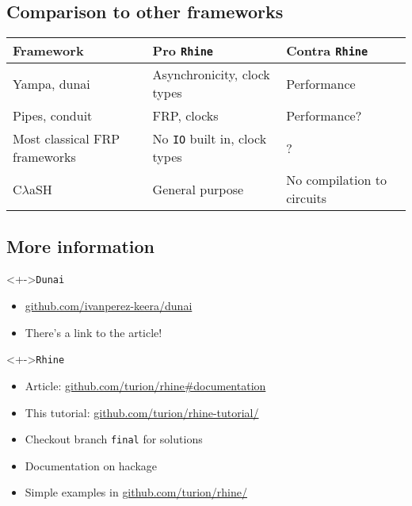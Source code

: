 \documentclass{enigtex-beamer-base}
\begin{document}
\subsection{Comparison to other frameworks}

\begin{frame}[fragile]
	\begin{tabular}{p{2.5cm}p{3.5cm}p{3.5cm}}
		\toprule
		\textbf{Framework}
			& \textbf{Pro \texttt{Rhine}}
				& \textbf{Contra \texttt{Rhine}}
		\\\midrule
		Yampa, dunai
			& Asynchronicity, clock types
				& Performance
		\\\midrule
		Pipes, conduit
			& FRP, clocks
				& Performance?
		\\\midrule
		Most classical FRP frameworks
			& No \texttt{IO} built in, clock types
				& ?
		\\\midrule
		C$\lambda$aSH
			& General purpose
				& No compilation to circuits
	\end{tabular}
\end{frame}

\subsection{More information}

\begin{frame}[fragile]
	\begin{block}<+->{\texttt{Dunai}}
		\begin{itemize}[<+->]
			\item  \href{https://github.com/ivanperez-keera/dunai}{github.com/ivanperez-keera/dunai}
			\item There's a link to the article!
		\end{itemize}
	\end{block}
	\begin{block}<+->{\texttt{Rhine}}
		\begin{itemize}[<+->]
			\item Article: \href{https://github.com/turion/rhine#documentation}{github.com/turion/rhine\#documentation}
			\item This tutorial: \href{https://github.com/turion/rhine-tutorial/}{github.com/turion/rhine-tutorial/}
			\item Checkout branch \texttt{final} for solutions
			\item Documentation on hackage
			\item Simple examples in \href{https://github.com/turion/rhine/}{github.com/turion/rhine/}
		\end{itemize}
	\end{block}
\end{frame}
\end{document}
